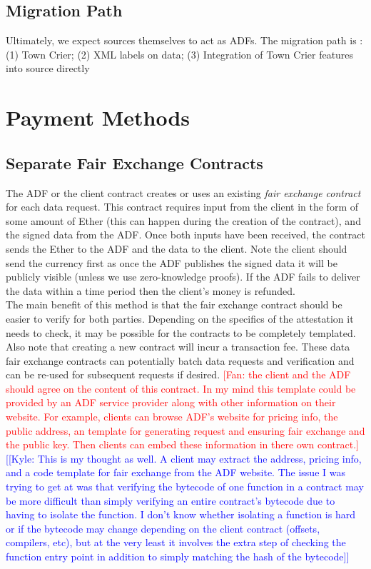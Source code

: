 \documentclass{article}
\newcommand{\kyle}[1]{\textcolor{blue}{[[\textsf{Kyle:  #1}]]}}
\newcommand{\fan}[1]{\textcolor{red}{[\textsf{Fan:  #1}]}}
\begin{document}
\subsection{Migration Path}

Ultimately, we expect sources themselves to act as ADFs. The migration path is : (1) Town Crier; (2) XML labels on data; (3) Integration of Town Crier features into source directly

\section{Payment Methods}	
\subsection{Separate Fair Exchange Contracts}
    The ADF or the client contract creates or uses an existing \emph{fair exchange contract} for each data request.  This contract requires input from the client in the form of some amount of Ether (this can happen during the creation of the contract), and the signed data from the ADF.  Once both inputs have been received, the contract sends the Ether to the ADF and the data to the client. Note the client should send the currency first as once the ADF publishes the signed data it will be publicly visible (unless we use zero-knowledge proofs). If the ADF fails to deliver the data within a time period then the client's money is refunded.\\
    \indent The main benefit of this method is that the fair exchange contract should be easier to verify for both parties.  Depending on the specifics of the attestation it needs to check, it may be possible for the contracts to be completely templated.  Also note that creating a new contract will incur a transaction fee.  These data fair exchange contracts can potentially batch data requests and verification and can be re-used for subsequent requests if desired. \fan{the client and the ADF should agree on the content of this contract. In my mind this template could be provided by an ADF service provider along with other information on their website. For example, clients can browse ADF's website for pricing info, the public address, an template for generating request and ensuring fair exchange and the public key. Then clients can embed these information in there own contract.}\\
    \kyle{This is my thought as well.  A client may extract the address, pricing info, and a code template for fair exchange from the ADF website.  The issue I was trying to get at was that verifying the bytecode of one function in a contract may be more difficult than simply verifying an entire contract's bytecode due to having to isolate the function.  I don't know whether isolating a function is hard or if the bytecode may change depending on the client contract (offsets, compilers, etc), but at the very least it involves the extra step of checking the function entry point in addition to simply matching the hash of the bytecode}
    
\end{document}
